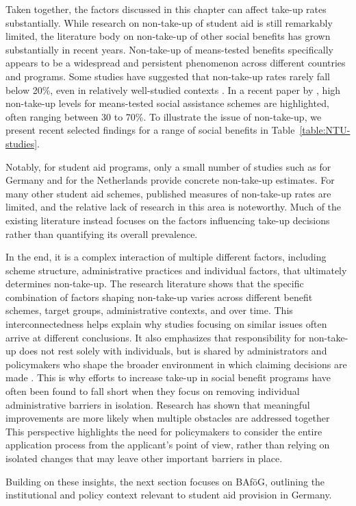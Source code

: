 
Taken together, the factors discussed in this chapter can affect take-up rates substantially. While research on non-take-up of student aid is still remarkably limited, the literature body on non-take-up of other social benefits has grown substantially in recent years. Non-take-up of means-tested benefits specifically appears to be a widespread and persistent phenomenon across different countries and programs. Some studies have suggested that non-take-up rates rarely fall below 20\%, even in relatively well-studied contexts \citep{vanoorschot_failing_2002}. In a recent paper by \cite{goedeme_concept_2020}, high non-take-up levels for means-tested social assistance schemes are highlighted, often ranging between 30 to 70\%. To illustrate the issue of non-take-up, we present recent selected findings for a range of social benefits in Table~\ref{table:NTU-studies}.



Notably, for student aid programs, only a small number of studies such as \cite{herber_non-take-up_2019} for Germany and \cite{konijn_quantifying_2023} for the Netherlands provide concrete non-take-up estimates. For many other student aid schemes, published measures of non-take-up rates are limited, and the relative lack of research in this area is noteworthy. Much of the existing literature instead focuses on the factors influencing take-up decisions rather than quantifying its overall prevalence.

In the end, it is a complex interaction of multiple different factors, including scheme structure, administrative practices and individual factors, that ultimately determines non-take-up. The research literature shows that the specific combination of factors shaping non-take-up varies across different benefit schemes, target groups, administrative contexts, and over time. This interconnectedness helps explain why studies focusing on similar issues often arrive at different conclusions. It also emphasizes that responsibility for non-take-up does not rest solely with individuals, but is shared by administrators and policymakers who shape the broader environment in which claiming decisions are made \citep{vanoorschot_failing_2002}. This is why efforts to increase take-up in social benefit programs have often been found to fall short when they focus on removing individual administrative barriers in isolation. Research has shown that meaningful improvements are more likely when multiple obstacles are addressed together \citep{currie_takeup_2004} This perspective highlights the need for policymakers to consider the entire application process from the applicant’s point of view, rather than relying on isolated changes that may leave other important barriers in place.

Building on these insights, the next section focuses on BAföG, outlining the institutional and policy context relevant to student aid provision in Germany.